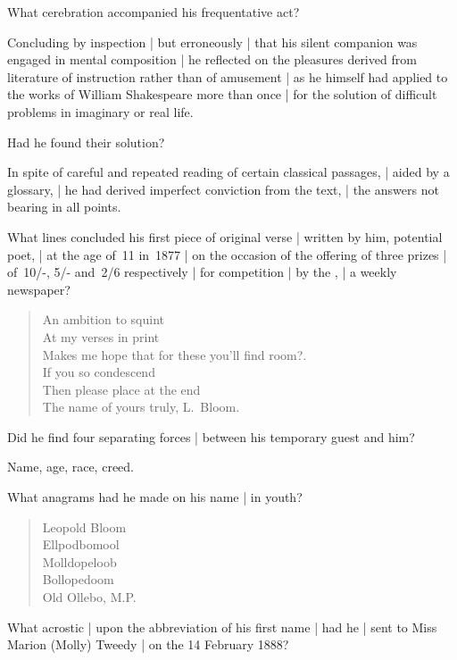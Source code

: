 What cerebration accompanied his frequentative act?

\Philosophy
Concluding by inspection |
but erroneously |
that his silent companion was engaged in mental composition |
he reflected on the pleasures derived
from literature of instruction rather than of amusement |
as he himself had applied to the works of William Shakespeare more than once |
for the solution of difficult problems in imaginary or real life.


Had he found their solution?

\Philosophy
In spite of careful and repeated reading of certain classical passages, |
aided by a glossary, |
he had derived imperfect conviction from the text, |
the answers not bearing in all points.


What lines concluded his first piece of original verse |
written by him, potential poet, |
at the age of~11 in~1877 |
on the occasion of the offering of three prizes |
of~10/-, 5/- and~2/6 respectively |
for competition |
by the , |
a weekly newspaper?

\Poetry

\begin{verse}
    An ambition to squint\\
    At my verses in print\\
    Makes me hope that for these you'll find room?.\\
    If you so condescend\\
    Then please place at the end%
\\
    The name of yours truly, L.~Bloom.
\end{verse}

Did he find four separating forces |
between his temporary guest and him?

\Philosophy
Name, age, race, creed.


What anagrams had he made on his name |
in youth?

\Poetry

\begin{verse}
    Leopold Bloom\\
    Ellpodbomool\\
    Molldopeloob\\
    Bollopedoom\\
    Old Ollebo, M.P.
\end{verse}


What acrostic |
upon the abbreviation of his first name |
had he
 |
sent to Miss Marion (Molly) Tweedy |
on the 14 February 1888?

